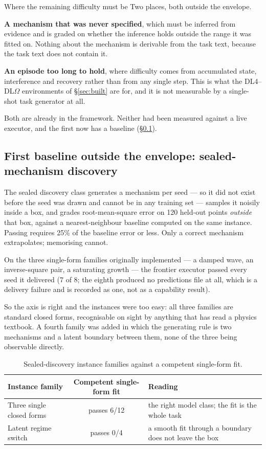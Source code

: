 \documentclass[11pt]{article}
\theoremstyle{definition}
\newcommand{\Om}{\ensuremath{\Omega}}
\begin{document}
\begin{cautionbox}{Where the remaining difficulty must be}
Two places, both outside the envelope.

\textbf{A mechanism that was never specified}, which must be inferred from evidence and is graded on whether the inference holds outside the range it was fitted on. Nothing about the mechanism is derivable from the task text, because the task text does not contain it.

\textbf{An episode too long to hold}, where difficulty comes from accumulated state, interference and recovery rather than from any single step. This is what the DL4--DL\Om{} environments of \S\ref{sec:built} are for, and it is not measurable by a single-shot task generator at all.

Both are already in the framework. Neither had been measured against a live executor, and the first now has a baseline (\S\ref{sec:discovery}).
\end{cautionbox}

\subsection{First baseline outside the envelope: sealed-mechanism discovery}\label{sec:discovery}

The sealed discovery class generates a mechanism per seed --- so it did not exist before the seed was drawn and cannot be in any training set --- samples it noisily inside a box, and grades root-mean-square error on 120 held-out points \emph{outside} that box, against a nearest-neighbour baseline computed on the same instance. Passing requires 25\% of the baseline error or less. Only a correct mechanism extrapolates; memorising cannot.

On the three single-form families originally implemented --- a damped wave, an inverse-square pair, a saturating growth --- the frontier executor passed every seed it delivered (7 of 8; the eighth produced no predictions file at all, which is a delivery failure and is recorded as one, not as a capability result).

So the axis is right and the instances were too easy: all three families are standard closed forms, recognisable on sight by anything that has read a physics textbook. A fourth family was added in which the generating rule is two mechanisms and a latent boundary between them, none of the three being observable directly.

\begin{table}[H]
\centering\small
\begin{tabularx}{\textwidth}{@{}lcY@{}}
\toprule
Instance family & Competent single-form fit & Reading \\
\midrule
Three single closed forms & passes 6/12 & the right model class; the fit is the whole task \\
Latent regime switch & passes 0/4 & a smooth fit through a boundary does not leave the box \\
\bottomrule
\end{tabularx}
\caption{Sealed-discovery instance families against a competent single-form fit.}
\label{tab:sealedfamilies}
\end{table}
\end{document}
